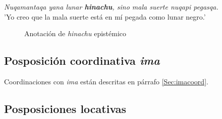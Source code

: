 \documentclass[a4paper,11pt,DIV12]{scrartcl}
\begin{document}
\begin{examples}
 \item\label{Ex:hinachu} {\em Nuqamantaqa yana lunar \textbf{hinachu}, sino mala suerte nuqapi pegasqa.}\\
	    'Yo creo que la mala suerte está en mí pegada como lunar negro.'\\
	        	\hfill{\small \citep{Valderrama77}}
\end{examples}

\begin{figure}
 \begin{center}
\end{center}
\caption{Anotaci\'on de {\em hinachu} epist\'emico}\label{Fig:hinachu}
\end{figure}


\subsection{Posposici\'on coordinativa {\em ima}}
Coordinaciones con {\em ima} est\'an descritas en p\'arrafo \ref{Sec:imacoord}.

\subsection{Posposiciones locativas}
\end{document}
